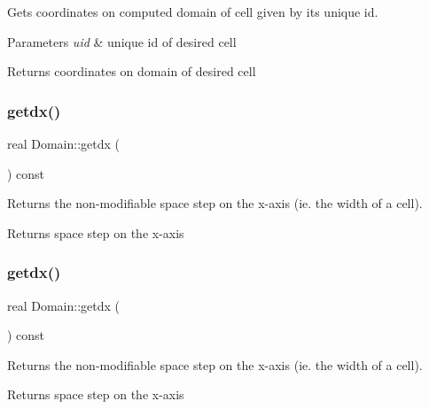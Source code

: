 Gets coordinates on computed domain of cell given by its unique id. 


\begin{DoxyParams}{Parameters}
{\em uid} & unique id of desired cell\\
\hline
\end{DoxyParams}
\begin{DoxyReturn}{Returns}
coordinates on domain of desired cell 
\end{DoxyReturn}
\mbox{\label{classDomain_acdb586f6ef994a1621680ec9b946aeb4}} 
\subsubsection{\texorpdfstring{getdx()}{getdx()}\hspace{0.1cm}{\footnotesize\ttfamily [1/2]}}
{\footnotesize\ttfamily real Domain\+::getdx (\begin{DoxyParamCaption}{ }\end{DoxyParamCaption}) const}



Returns the non-\/modifiable space step on the x-\/axis (ie. the width of a cell). 

\begin{DoxyReturn}{Returns}
space step on the x-\/axis 
\end{DoxyReturn}
\mbox{\label{classDomain_acdb586f6ef994a1621680ec9b946aeb4}} 
\subsubsection{\texorpdfstring{getdx()}{getdx()}\hspace{0.1cm}{\footnotesize\ttfamily [2/2]}}
{\footnotesize\ttfamily real Domain\+::getdx (\begin{DoxyParamCaption}{ }\end{DoxyParamCaption}) const}



Returns the non-\/modifiable space step on the x-\/axis (ie. the width of a cell). 

\begin{DoxyReturn}{Returns}
space step on the x-\/axis 
\end{DoxyReturn}
\mbox{\label{classDomain_a5e62ab8a8b53f67cc3c30b6066b10aac}} 
